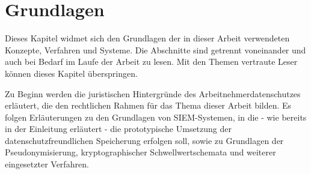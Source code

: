 \chapter{Grundlagen}

\label{cha_basics}

Dieses Kapitel widmet sich den Grundlagen der in dieser Arbeit verwendeten Konzepte, Verfahren und Systeme. Die Abschnitte sind getrennt voneinander und auch bei Bedarf im Laufe der Arbeit zu lesen. Mit den Themen vertraute Leser können dieses Kapitel überspringen.

Zu Beginn werden die juristischen Hintergründe des Arbeitnehmerdatenschutzes erläutert, die den rechtlichen Rahmen für das Thema dieser Arbeit bilden. Es folgen Erläuterungen zu den Grundlagen von SIEM-Systemen, in die - wie bereits in der Einleitung erläutert - die prototypische Umsetzung der datenschutzfreundlichen Speicherung erfolgen soll, sowie zu Grundlagen der Pseudonymisierung, kryptographischer Schwellwertschemata und weiterer eingesetzter Verfahren.











